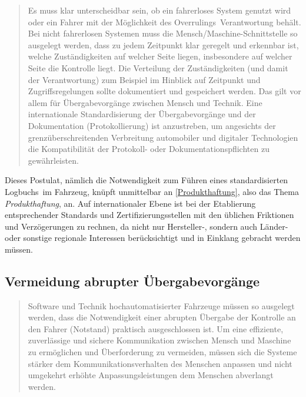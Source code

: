 \documentclass[twoside,a4paper,12pt]{article}
\begin{document}
\begin{quote}
\glqq
Es muss klar unterscheidbar sein, ob ein fahrerloses System genutzt wird oder ein Fahrer
mit der Möglichkeit des \glqq Overrulings\grqq\ Verantwortung behält. Bei nicht fahrerlosen Systemen muss die Mensch/Maschine-Schnittstelle 
so ausgelegt werden, dass zu jedem Zeitpunkt klar geregelt und erkennbar ist, welche Zuständigkeiten auf welcher Seite liegen,
insbesondere auf welcher Seite die Kontrolle liegt. Die Verteilung der Zuständigkeiten
(und damit der Verantwortung) zum Beispiel im Hinblick auf Zeitpunkt und Zugriffsregelungen sollte dokumentiert und gespeichert werden. 
Das gilt vor allem für Übergabevorgänge zwischen Mensch und Technik. Eine internationale Standardisierung der Übergabevorgänge 
und der Dokumentation (Protokollierung) ist anzustreben, um angesichts der
grenzüberschreitenden Verbreitung automobiler und digitaler Technologien die Kompatibilität der Protokoll- oder 
Dokumentationspflichten zu gewährleisten.\grqq\mbox{~\cite[S. 13]{ek}}
\end{quote}

Dieses Postulat, nämlich die Notwendigkeit zum Führen eines standardisierten \glqq Logbuchs\grqq\ im Fahrzeug, knüpft unmittelbar an 
\ref{Produkthaftung}, also das Thema \textit{Produkthaftung}, an. Auf internationaler Ebene ist bei der Etablierung entsprechender Standards 
und Zertifizierungsstellen mit den üblichen Friktionen und Verzögerungen zu rechnen, da nicht nur Hersteller-, sondern auch Länder- oder 
sonstige regionale Interessen berücksichtigt und in Einklang gebracht werden müssen.

\subsection{Vermeidung abrupter Übergabevorgänge} \label{VermeidungAbrupterUebergabevorgaenge}

\begin{quote}
\glqq
Software und Technik hochautomatisierter Fahrzeuge müssen so ausgelegt werden, dass
die Notwendigkeit einer abrupten Übergabe der Kontrolle an den Fahrer (\glqq Notstand\grqq)
praktisch ausgeschlossen ist. Um eine effiziente, zuverlässige und sichere Kommunikation zwischen Mensch und Maschine zu 
ermöglichen und Überforderung zu vermeiden,
müssen sich die Systeme stärker dem Kommunikationsverhalten des Menschen anpassen
und nicht umgekehrt erhöhte Anpassungsleistungen dem Menschen abverlangt werden.\grqq\mbox{~\cite[S. 13]{ek}}
\end{quote}
\end{document}
